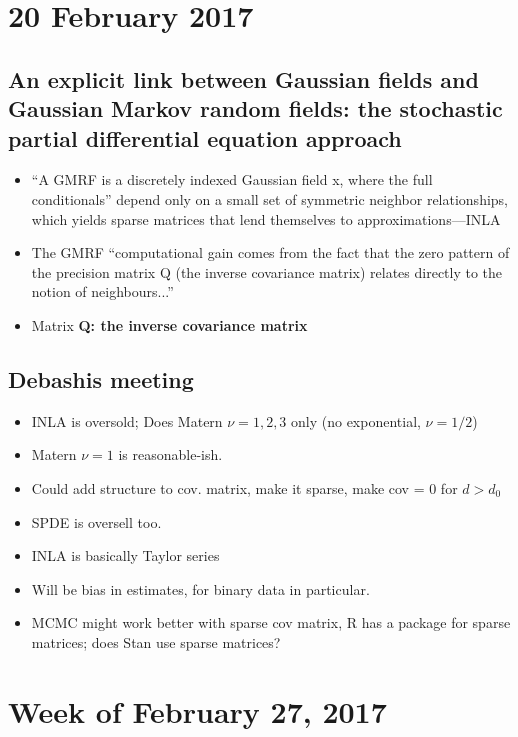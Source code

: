 \documentclass{article}
\begin{document}
\section*{20 February 2017}




\subsection*{An explicit link between Gaussian fields and Gaussian Markov random fields: the stochastic partial differential equation approach \citep{Lindgren2011}}
\begin{itemize}
\item ``A GMRF is a discretely indexed Gaussian field x, where the full conditionals'' depend only on a small set of symmetric neighbor relationships, which yields sparse matrices that lend themselves to approximations---INLA
\item The GMRF ``computational gain comes from the fact that the zero pattern of the precision matrix Q (the inverse covariance matrix) relates directly to the notion of neighbours...''
\item Matrix {\bf Q: the inverse covariance matrix}
\end{itemize}

\subsection*{Debashis meeting}
\begin{itemize}
\item INLA is oversold; Does Matern $\nu = 1, 2, 3$ only (no exponential, $\nu = 1/2$)
\item Matern $\nu = 1$ is reasonable-ish.
\item Could add structure to cov. matrix, make it sparse, make cov = 0 for $d > d_{0}$
\item SPDE is oversell too.
\item INLA is basically Taylor series
\item Will be bias in estimates, for binary data in particular.
\item MCMC might work better with sparse cov matrix, R has a package for sparse matrices; does Stan use sparse matrices?
\end{itemize}

\section*{Week of February 27, 2017}
\end{document}
